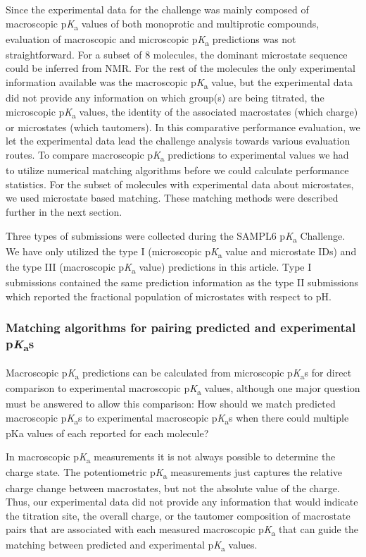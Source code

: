 \documentclass[9pt,lineno,final]{elife}
\newcommand{\pKa}{p\textit{K}\textsubscript{a}}
\begin{document}
Since the experimental data for the challenge was mainly composed of macroscopic \pKa{} values of both monoprotic and multiprotic compounds, evaluation of macroscopic and microscopic \pKa{} predictions was not straightforward. For a subset of 8 molecules, the dominant microstate sequence could be inferred from NMR. For the rest of the molecules the only experimental information available was the macroscopic \pKa{} value, but the experimental data did not provide any information on which group(s) are being titrated, the microscopic \pKa{} values, the identity of the associated macrostates (which charge) or microstates (which tautomers). In this comparative performance evaluation, we let the experimental data lead the challenge analysis towards various evaluation routes. To compare macroscopic \pKa{} predictions to experimental values we had to utilize numerical matching algorithms before we could calculate performance statistics. For the subset of molecules with experimental data about microstates, we used microstate based matching. These matching methods were described further in the next section.

Three types of submissions were collected during the SAMPL6 \pKa{} Challenge. We have only utilized the type I (microscopic \pKa{} value and microstate IDs) and the type III (macroscopic \pKa{} value) predictions in this article. Type I submissions contained the same prediction information as the type II submissions which reported the fractional population of microstates with respect to pH.


\subsubsection{Matching algorithms for pairing predicted and experimental \pKa{}s}

Macroscopic \pKa{} predictions can be calculated from microscopic \pKa{}s for direct comparison to experimental macroscopic \pKa{} values, although one major question must be answered to allow this comparison:  
How should we match predicted macroscopic \pKa{}s to experimental macroscopic \pKa{}s when there could multiple pKa values of each reported for each molecule? 

In macroscopic \pKa{} measurements it is not always possible to determine the charge state.  The potentiometric \pKa{} measurements just captures the relative charge change between macrostates, but not the absolute value of the charge.  
Thus, our experimental data did not provide any information that would indicate the titration site, the overall charge, or the tautomer composition of macrostate pairs that are associated with each measured macroscopic \pKa{} that can guide the matching between predicted and experimental \pKa{} values. 
 
\end{document}
